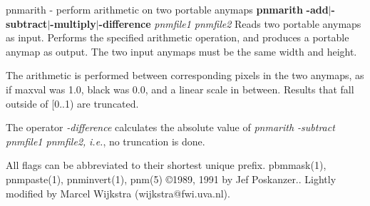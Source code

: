 pnmarith - perform arithmetic on two portable anymaps
{\bf pnmarith}
{\bf -add}{\rm $|$}{\bf -subtract}{\rm $|$}{\bf -multiply}{\rm $|$}{\bf -difference}
{\it pnmfile1 pnmfile2}
Reads two portable anymaps as input.
Performs the specified arithmetic operation,
and produces a portable anymap as output.
The two input anymaps must be the same width and height.
\par
The arithmetic is performed between corresponding pixels in the two
anymaps, as if maxval was 1.0, black was 0.0, and a linear scale in between.
Results that fall outside of [0..1) are truncated.
\par
The operator
{\it -difference}
calculates the absolute value of
{\it pnmarith -subtract pnmfile1 pnmfile2,}
{\it i.e.}, no truncation is done.
\par
All flags can be abbreviated to their shortest unique prefix.
pbmmask(1), pnmpaste(1), pnminvert(1), pnm(5)
\copyright 1989, 1991 by Jef Poskanzer..
Lightly modified by Marcel Wijkstra (wijkstra@fwi.uva.nl).
%
 
%

\newpage
%

